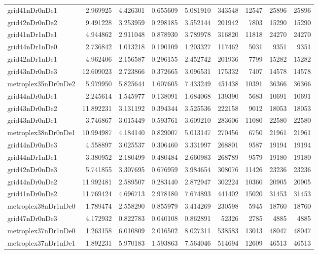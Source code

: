 \begin{longtable}{|l|r|r|r|r|r|r|r|r|}
grid41nDr0nDe1 & 2.969925 & 4.426301 & 0.655609 & 5.081910 & 343548 & 12547 & 25896 & 25896 \\
grid42nDr0nDe2 & 9.491228 & 3.253959 & 0.298185 & 3.552144 & 201942 & 7803 & 15290 & 15290 \\
grid41nDr1nDe1 & 4.944862 & 2.911048 & 0.878930 & 3.789978 & 316820 & 11818 & 24270 & 24270 \\
grid44nDr1nDe0 & 2.736842 & 1.013218 & 0.190109 & 1.203327 & 117462 & 5031 & 9351 & 9351 \\
grid42nDr1nDe1 & 4.962406 & 2.156587 & 0.296155 & 2.452742 & 201936 & 7799 & 15282 & 15282 \\
grid43nDr0nDe3 & 12.609023 & 2.723866 & 0.372665 & 3.096531 & 175332 & 7407 & 14578 & 14578 \\
metroplex35nDr0nDe2 & 5.979950 & 5.825644 & 1.607605 & 7.433249 & 451438 & 10391 & 36366 & 36366 \\
grid44nDr0nDe1 & 2.245614 & 1.545977 & 0.138091 & 1.684068 & 139390 & 5683 & 10691 & 10691 \\
grid43nDr0nDe2 & 11.892231 & 3.131192 & 0.394344 & 3.525536 & 222158 & 9012 & 18053 & 18053 \\
grid43nDr0nDe1 & 3.746867 & 3.015449 & 0.593761 & 3.609210 & 283606 & 11080 & 22580 & 22580 \\
metroplex38nDr0nDe1 & 10.994987 & 4.184140 & 0.829007 & 5.013147 & 270456 & 6750 & 21961 & 21961 \\
grid44nDr0nDe3 & 4.558897 & 3.025537 & 0.306460 & 3.331997 & 268801 & 9587 & 19194 & 19194 \\
grid44nDr1nDe1 & 3.380952 & 2.180499 & 0.480484 & 2.660983 & 268789 & 9579 & 19180 & 19180 \\
grid42nDr0nDe3 & 5.741855 & 3.307695 & 0.676959 & 3.984654 & 308076 & 11426 & 23236 & 23236 \\
grid44nDr0nDe2 & 11.992481 & 2.589507 & 0.283440 & 2.872947 & 302224 & 10360 & 20905 & 20905 \\
grid41nDr0nDe2 & 11.769424 & 4.696713 & 2.978180 & 7.674893 & 441402 & 15020 & 31453 & 31453 \\
metroplex38nDr1nDe0 & 1.789474 & 2.558290 & 0.855979 & 3.414269 & 230598 & 5945 & 18760 & 18760 \\
grid47nDr0nDe3 & 4.172932 & 0.822783 & 0.040108 & 0.862891 & 52326 & 2785 & 4885 & 4885 \\
metroplex37nDr1nDe0 & 1.263158 & 6.010809 & 2.016502 & 8.027311 & 538583 & 13013 & 48047 & 48047 \\
metroplex37nDr1nDe1 & 1.892231 & 5.970183 & 1.593863 & 7.564046 & 514694 & 12609 & 46513 & 46513 \\

\end{longtable}
